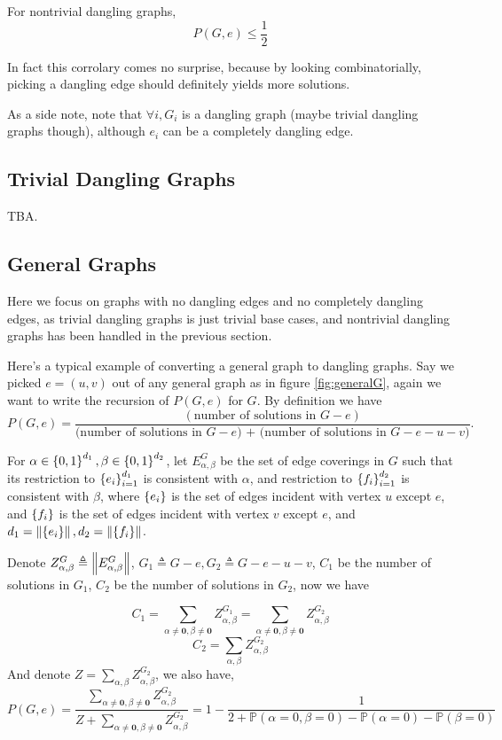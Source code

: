 \begin{Cor}
	For nontrivial dangling graphs,
	\[P(G, e) \leq \frac{1}{2}\]
\end{Cor}

In fact this corrolary comes no surprise, because by looking combinatorially, picking a dangling edge should definitely yields more solutions.

As a side note, note that $\forall i, G_i$ is a dangling graph (maybe trivial dangling graphs though), although $e_i$ can be a completely dangling edge.


\subsection{Trivial Dangling Graphs}
TBA.

\subsection{General Graphs}
Here we focus on graphs with no dangling edges and no completely dangling edges, as trivial dangling graphs is just trivial base cases, and nontrivial dangling graphs has been handled in the previous section.

Here's a typical example of converting a general graph to dangling graphs.
Say we picked $e=(u,v)$ out of any general graph as in figure \ref{fig:generalG}, again we want to write the recursion of $P(G,e)$ for $G$.
By definition we have 
\begin{equation}
	P(G,e) = \frac{(\textrm{number of solutions in $G-e$})}{\textrm{(number of solutions in $G-e$) + (number of solutions in $G-e-u-v$)}}.
\end{equation}


	For $\alpha \in \left\{0,1\right\}^{d_1}, \beta \in \left\{0,1\right\}^{d_2}$, let $E_{\alpha,\beta}^G$ be the set of edge coverings in $G$ such that its restriction to $\left\{e_i\right\}_{i=1}^{d_1}$ is consistent with $\alpha$, and restriction to $\left\{f_i\right\}_{i=1}^{d_2}$ is consistent with $\beta$,  where $\left\{e_i\right\}$ is the set of edges incident with vertex $u$ except $e$, and $\left\{f_i\right\}$ is the set of edges incident with vertex $v$ except $e$, and $d_1 = \left\Vert\left\{e_i\right\}\right\Vert, d_2 = \left\Vert\left\{f_i\right\}\right\Vert$.

	Denote $Z_{\alpha, \beta}^G \triangleq \left\Vert E_{\alpha, \beta}^G\right\Vert$, $G_1 \triangleq G-e, G_2 \triangleq G-e-u-v$, $C_1$ be the number of solutions in $G_1$, $C_2$ be the number of solutions in $G_2$, now we have
\begin{Prop}
\[C_1 = \sum_{\alpha \neq \mathbf{0}, \beta \neq \mathbf{0}} Z_{\alpha, \beta}^{G_1} = \sum_{\alpha \neq \mathbf{0}, \beta \neq \mathbf{0}} Z_{\alpha, \beta}^{G_2}\]
\[C_2 = \sum_{\alpha , \beta} Z_{\alpha, \beta}^{G_2}\]
And denote $Z = \sum_{\alpha , \beta} Z_{\alpha, \beta}^{G_2}$, we also have,
\[P(G,e) = \frac{\sum_{\alpha \neq \mathbf{0}, \beta \neq \mathbf{0}} Z_{\alpha, \beta}^{G_2}}{Z + \sum_{\alpha \neq \mathbf{0}, \beta \neq \mathbf{0}} Z_{\alpha, \beta}^{G_2}} = 1 - \frac{1}{2 + \mathbb{P}\left( \alpha = 0, \beta = 0 \right) - \mathbb{P} \left( \alpha = 0 \right) - \mathbb{P} \left( \beta = 0 \right)}\]
\end{Prop}


